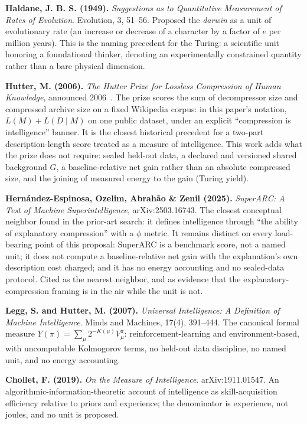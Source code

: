 \documentclass[11pt]{article}
\begin{document}
\textbf{Haldane, J. B. S. (1949).} \textit{Suggestions as to Quantitative Measurement of Rates of Evolution}. Evolution, 3, 51--56. Proposed the \textit{darwin} as a unit of evolutionary rate (an increase or decrease of a character by a factor of \(e\) per million years). This is the naming precedent for the Turing: a scientific unit honoring a foundational thinker, denoting an experimentally constrained quantity rather than a bare physical dimension.

\textbf{Hutter, M. (2006).} \textit{The Hutter Prize for Lossless Compression of Human Knowledge}, announced 2006~\cite{hutter2006}. The prize scores the sum of decompressor size and compressed archive size on a fixed Wikipedia corpus: in this paper's notation, \(L(M)+L(D\mid M)\) on one public dataset, under an explicit ``compression is intelligence'' banner. It is the closest historical precedent for a two-part description-length score treated as a measure of intelligence. This work adds what the prize does not require: sealed held-out data, a declared and versioned shared background \(G\), a baseline-relative net gain rather than an absolute compressed size, and the joining of measured energy to the gain (Turing yield).

\textbf{Hern{\'a}ndez-Espinosa, Ozelim, Abrah{\~a}o \& Zenil (2025).} \textit{SuperARC: A Test of Machine Superintelligence}, arXiv:2503.16743. The closest conceptual neighbor found in the prior-art search: it defines intelligence through ``the ability of explanatory compression'' with a \(\phi\) metric. It remains distinct on every load-bearing point of this proposal: SuperARC is a benchmark score, not a named unit; it does not compute a baseline-relative net gain with the explanation's own description cost charged; and it has no energy accounting and no sealed-data protocol. Cited as the nearest neighbor, and as evidence that the explanatory-compression framing is in the air while the unit is not.

\textbf{Legg, S. and Hutter, M. (2007).} \textit{Universal Intelligence: A Definition of Machine Intelligence}. Minds and Machines, 17(4), 391--444. The canonical formal measure \(Y(\pi)=\sum_{\mu} 2^{-K(\mu)} V^{\pi}_{\mu}\): reinforcement-learning and environment-based, with uncomputable Kolmogorov terms, no held-out data discipline, no named unit, and no energy accounting.

\textbf{Chollet, F. (2019).} \textit{On the Measure of Intelligence}. arXiv:1911.01547. An algorithmic-information-theoretic account of intelligence as skill-acquisition efficiency relative to priors and experience; the denominator is experience, not joules, and no unit is proposed.
\end{document}
